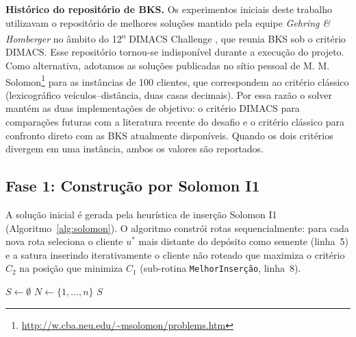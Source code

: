 \documentclass[10pt, a4paper]{article}
\begin{document}
\textbf{Hist\'orico do reposit\'orio de BKS.} Os experimentos iniciais deste trabalho utilizavam o reposit\'orio de melhores solu\c{c}\~oes mantido pela equipe \emph{Gehring \& Homberger} no \^ambito do 12\textsuperscript{o} DIMACS Challenge \citep{gehring1999, DIMACS2014}, que reunia BKS sob o crit\'erio DIMACS. Esse reposit\'orio tornou-se indispon\'ivel durante a execu\c{c}\~ao do projeto. Como alternativa, adotamos as solu\c{c}\~oes publicadas no s\'itio pessoal de M. M. Solomon\footnote{\url{http://w.cba.neu.edu/~msolomon/problems.htm}} para as inst\^ancias de 100 clientes, que correspondem ao crit\'erio cl\'assico (lexicogr\'afico ve\'iculos--dist\^ancia, duas casas decimais). Por essa raz\~ao o solver mant\'em as duas implementa\c{c}\~oes de objetivo: o crit\'erio DIMACS para compara\c{c}\~oes futuras com a literatura recente do desafio e o crit\'erio cl\'assico para confronto direto com as BKS atualmente dispon\'iveis. Quando os dois crit\'erios divergem em uma inst\^ancia, ambos os valores s\~ao reportados.

\subsection{Fase 1: Constru\c{c}\~ao por Solomon I1}
\label{sec-solomon}

A solu\c{c}\~ao inicial \'e gerada pela heur\'istica de inser\c{c}\~ao Solomon I1 (Algoritmo~\ref{alg:solomon}). O algoritmo constr\'oi rotas sequencialmente: para cada nova rota seleciona o cliente $u^*$ mais distante do dep\'osito como semente (linha~5) e a satura inserindo iterativamente o cliente n\~ao roteado que maximiza o crit\'erio $C_2$ na posi\c{c}\~ao que minimiza $C_1$ (sub-rotina \texttt{MelhorInser\c{c}\~ao}, linha~8).

\begin{algorithm}[H]
\caption{Solomon I1 (constru\c{c}\~ao por inser\c{c}\~ao)}
\label{alg:solomon}
$S \leftarrow \emptyset$\;
$N \leftarrow \{1, \ldots, n\}$\;
\Return $S$\;
\end{algorithm}
\end{document}
